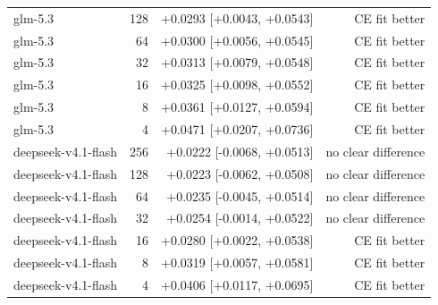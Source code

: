 \begin{longtable}{lrrr}
glm-5.3 & 128 & +0.0293 [+0.0043, +0.0543] & CE fit better \\
glm-5.3 & 64 & +0.0300 [+0.0056, +0.0545] & CE fit better \\
glm-5.3 & 32 & +0.0313 [+0.0079, +0.0548] & CE fit better \\
glm-5.3 & 16 & +0.0325 [+0.0098, +0.0552] & CE fit better \\
glm-5.3 & 8 & +0.0361 [+0.0127, +0.0594] & CE fit better \\
glm-5.3 & 4 & +0.0471 [+0.0207, +0.0736] & CE fit better \\
deepseek-v4.1-flash & 256 & +0.0222 [-0.0068, +0.0513] & no clear difference \\
deepseek-v4.1-flash & 128 & +0.0223 [-0.0062, +0.0508] & no clear difference \\
deepseek-v4.1-flash & 64 & +0.0235 [-0.0045, +0.0514] & no clear difference \\
deepseek-v4.1-flash & 32 & +0.0254 [-0.0014, +0.0522] & no clear difference \\
deepseek-v4.1-flash & 16 & +0.0280 [+0.0022, +0.0538] & CE fit better \\
deepseek-v4.1-flash & 8 & +0.0319 [+0.0057, +0.0581] & CE fit better \\
deepseek-v4.1-flash & 4 & +0.0406 [+0.0117, +0.0695] & CE fit better \\
\bottomrule
\end{longtable}
